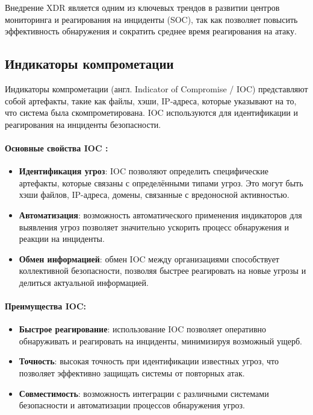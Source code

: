 Внедрение XDR является одним из ключевых трендов в развитии центров мониторинга и реагирования на инциденты (SOC), так как позволяет повысить эффективность обнаружения и сократить среднее время реагирования на атаку.

\subsection{Индикаторы компрометации}

Индикаторы компрометации (англ. Indicator of Compromise / IOC) представляют собой артефакты, такие как файлы, хэши, IP-адреса, которые указывают на то, что система была скомпрометирована. IOC используются для идентификации и реагирования на инциденты безопасности. \cite{KasperskyIoC}

\paragraph*{Основные свойства IOC \autocite{IDSClassification}:}
\begin{itemize}
    \item \textbf{Идентификация угроз}: IOC позволяют определить специфические артефакты, которые связаны с определёнными типами угроз. Это могут быть хэши файлов, IP-адреса, домены, связанные с вредоносной активностью.
    \item \textbf{Автоматизация}: возможность автоматического применения индикаторов для выявления угроз позволяет значительно ускорить процесс обнаружения и реакции на инциденты.
    \item \textbf{Обмен информацией}: обмен IOC между организациями способствует коллективной безопасности, позволяя быстрее реагировать на новые угрозы и делиться актуальной информацией.
\end{itemize}

\paragraph*{Преимущества IOC:}
\begin{itemize}
    \item \textbf{Быстрое реагирование}: использование IOC позволяет оперативно обнаруживать и реагировать на инциденты, минимизируя возможный ущерб.
    \item \textbf{Точность}: высокая точность при идентификации известных угроз, что позволяет эффективно защищать системы от повторных атак.
    \item \textbf{Совместимость}: возможность интеграции с различными системами безопасности и автоматизации процессов обнаружения угроз.
\end{itemize}

